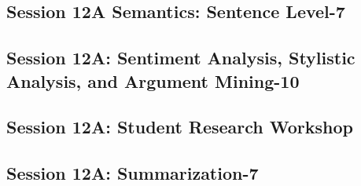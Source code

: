 \subsection{\large Session 12A Semantics: Sentence Level-7}
\label{parallel-session-12A-trackG}
\TrackGLoc\hfill\sessionchair{}{}
\clearpage
\subsection{\large Session 12A: Sentiment Analysis, Stylistic Analysis, and Argument Mining-10}
\label{parallel-session-12A-trackH}
\TrackHLoc\hfill\sessionchair{}{}
\clearpage
\subsection{\large Session 12A: Student Research Workshop}
\label{parallel-session-12A-trackI}
\TrackILoc\hfill\sessionchair{}{}
\clearpage
\subsection{\large Session 12A: Summarization-7}
\label{parallel-session-12A-trackJ}
\TrackJLoc\hfill\sessionchair{}{}
\clearpage


